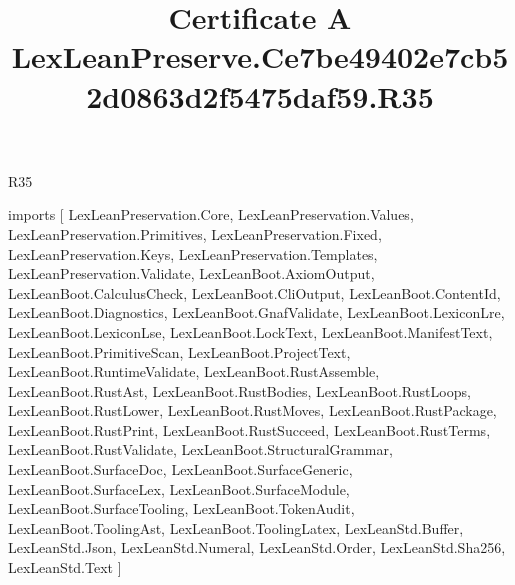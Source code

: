 \begin{lexlean}{R35}
\title{Certificate A LexLeanPreserve.Ce7be49402e7cb52d0863d2f5475daf59.R35}
\begin{coremodule}
imports [
  LexLeanPreservation.Core,
  LexLeanPreservation.Values,
  LexLeanPreservation.Primitives,
  LexLeanPreservation.Fixed,
  LexLeanPreservation.Keys,
  LexLeanPreservation.Templates,
  LexLeanPreservation.Validate,
  LexLeanBoot.AxiomOutput,
  LexLeanBoot.CalculusCheck,
  LexLeanBoot.CliOutput,
  LexLeanBoot.ContentId,
  LexLeanBoot.Diagnostics,
  LexLeanBoot.GnafValidate,
  LexLeanBoot.LexiconLre,
  LexLeanBoot.LexiconLse,
  LexLeanBoot.LockText,
  LexLeanBoot.ManifestText,
  LexLeanBoot.PrimitiveScan,
  LexLeanBoot.ProjectText,
  LexLeanBoot.RuntimeValidate,
  LexLeanBoot.RustAssemble,
  LexLeanBoot.RustAst,
  LexLeanBoot.RustBodies,
  LexLeanBoot.RustLoops,
  LexLeanBoot.RustLower,
  LexLeanBoot.RustMoves,
  LexLeanBoot.RustPackage,
  LexLeanBoot.RustPrint,
  LexLeanBoot.RustSucceed,
  LexLeanBoot.RustTerms,
  LexLeanBoot.RustValidate,
  LexLeanBoot.StructuralGrammar,
  LexLeanBoot.SurfaceDoc,
  LexLeanBoot.SurfaceGeneric,
  LexLeanBoot.SurfaceLex,
  LexLeanBoot.SurfaceModule,
  LexLeanBoot.SurfaceTooling,
  LexLeanBoot.TokenAudit,
  LexLeanBoot.ToolingAst,
  LexLeanBoot.ToolingLatex,
  LexLeanStd.Buffer,
  LexLeanStd.Json,
  LexLeanStd.Numeral,
  LexLeanStd.Order,
  LexLeanStd.Sha256,
  LexLeanStd.Text
]


\end{coremodule}
\end{lexlean}

